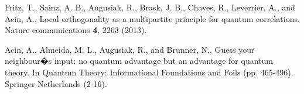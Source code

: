 \documentclass[aps,english,superscriptaddress,onecolumn,twoside,longbibliography,pra,floatfix,fleqn,notitlepage,nofootinbib]{revtex4-1}
\theoremstyle{definition}
\begin{document}

\begin{thebibliography}{10}

 Fritz, T., Sainz, A. B., Augusiak, R., Brask, J. B., Chaves, R., Leverrier, A., and Acin, A., Local orthogonality as a multipartite principle for quantum correlations. Nature communications {\bf 4},  2263 (2013).

 Acin, A., Almeida, M. L., Augusiak, R., and Brunner, N., Guess your neighbour�s input: no quantum advantage but an advantage for quantum theory. In Quantum Theory: Informational Foundations and Foils (pp. 465-496). Springer Netherlands (2-16). 

\end{thebibliography}
\end{document}
